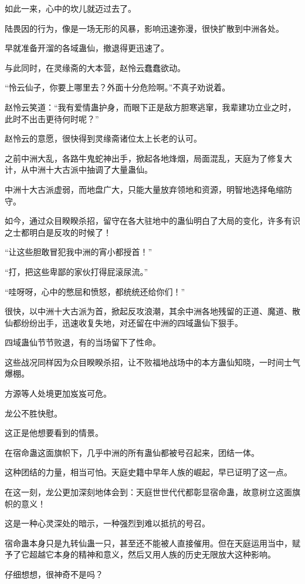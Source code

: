 \begin{this_body}
如此一来，心中的坎儿就迈过去了。

陆畏因的行为，像是一场无形的风暴，影响迅速弥漫，很快扩散到中洲各处。

早就准备开溜的各域蛊仙，撤退得更迅速了。

与此同时，在灵缘斋的大本营，赵怜云蠢蠢欲动。

“怜云仙子，你要上哪里去？外面十分危险啊。”不真子劝说着。

赵怜云笑道：“我有爱情蛊护身，而眼下正是敌方胆寒逃窜，我辈建功立业之时，此时不出击更待何时呢？”

赵怜云的意愿，很快得到灵缘斋诸位太上长老的认可。

之前中洲大乱，各路牛鬼蛇神出手，掀起各地烽烟，局面混乱，天庭为了修复大计，从中洲十大古派中抽调了大量蛊仙。

中洲十大古派虚弱，而地盘广大，只能大量放弃领地和资源，明智地选择龟缩防守。

如今，通过众目睽睽杀招，留守在各大驻地中的蛊仙明白了大局的变化，许多有识之士都明白是反攻的时候了！

“让这些胆敢冒犯我中洲的宵小都授首！”

“打，把这些卑鄙的家伙打得屁滚尿流。”

“哇呀呀，心中的憋屈和愤怒，都统统还给你们！”

很快，以中洲十大古派为首，掀起反攻浪潮，其余中洲各地残留的正道、魔道、散仙都纷纷出手，迅速收复失地，对还留在中洲的四域蛊仙下狠手。

四域蛊仙节节败退，有的当场留下了性命。

这些战况同样因为众目睽睽杀招，让不败福地战场中的本方蛊仙知晓，一时间士气爆棚。

方源等人处境更加岌岌可危。

龙公不胜快慰。

这正是他想要看到的情景。

在宿命蛊这面旗帜下，几乎中洲的所有蛊仙都被号召起来，团结一体。

这种团结的力量，相当可怕。天庭史籍中早年人族的崛起，早已证明了这一点。

在这一刻，龙公更加深刻地体会到：天庭世世代代都彰显宿命蛊，故意树立这面旗帜的意义！

这是一种心灵深处的暗示，一种强烈到难以抵抗的号召。

宿命蛊本身只是九转仙蛊一只，甚至还不能被人直接催用。但在天庭运用当中，赋予了它超越它本身的精神和意义，然后又用人族的历史无限放大这种影响。

仔细想想，很神奇不是吗？


\end{this_body}
